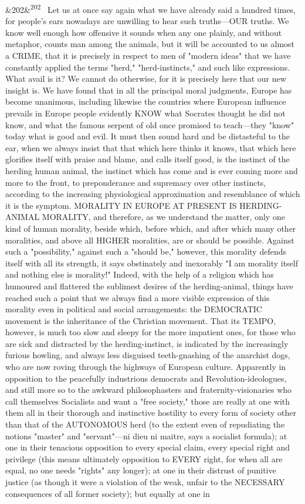 \documentclass[12pt]{article}
\newcommand{\para}[1][]{\par\noindent\ifx&#1&\else\textsuperscript{\footnotesize #1}~\fi}
\begin{document}
\para[202] Let us at once say again what we have already said a hundred times, for people's ears nowadays are unwilling to hear such truths---OUR truths. We know well enough how offensive it sounds when any one plainly, and without metaphor, counts man among the animals, but it will be accounted to us almost a CRIME, that it is precisely in respect to men of "modern ideas" that we have constantly applied the terms "herd," "herd-instincts," and such like expressions. What avail is it? We cannot do otherwise, for it is precisely here that our new insight is. We have found that in all the principal moral judgments, Europe has become unanimous, including likewise the countries where European influence prevails in Europe people evidently KNOW what Socrates thought he did not know, and what the famous serpent of old once promised to teach---they "know" today what is good and evil. It must then sound hard and be distasteful to the ear, when we always insist that that which here thinks it knows, that which here glorifies itself with praise and blame, and calls itself good, is the instinct of the herding human animal, the instinct which has come and is ever coming more and more to the front, to preponderance and supremacy over other instincts, according to the increasing physiological approximation and resemblance of which it is the symptom. MORALITY IN EUROPE AT PRESENT IS HERDING-ANIMAL MORALITY, and therefore, as we understand the matter, only one kind of human morality, beside which, before which, and after which many other moralities, and above all HIGHER moralities, are or should be possible. Against such a "possibility," against such a "should be," however, this morality defends itself with all its strength, it says obstinately and inexorably "I am morality itself and nothing else is morality!" Indeed, with the help of a religion which has humoured and flattered the sublimest desires of the herding-animal, things have reached such a point that we always find a more visible expression of this morality even in political and social arrangements: the DEMOCRATIC movement is the inheritance of the Christian movement. That its TEMPO, however, is much too slow and sleepy for the more impatient ones, for those who are sick and distracted by the herding-instinct, is indicated by the increasingly furious howling, and always less disguised teeth-gnashing of the anarchist dogs, who are now roving through the highways of European culture. Apparently in opposition to the peacefully industrious democrats and Revolution-ideologues, and still more so to the awkward philosophasters and fraternity-visionaries who call themselves Socialists and want a "free society," those are really at one with them all in their thorough and instinctive hostility to every form of society other than that of the AUTONOMOUS herd (to the extent even of repudiating the notions "master" and "servant"---ni dieu ni maitre, says a socialist formula); at one in their tenacious opposition to every special claim, every special right and privilege (this means ultimately opposition to EVERY right, for when all are equal, no one needs "rights" any longer); at one in their distrust of punitive justice (as though it were a violation of the weak, unfair to the NECESSARY consequences of all former society); but equally at one in 
\end{document}
